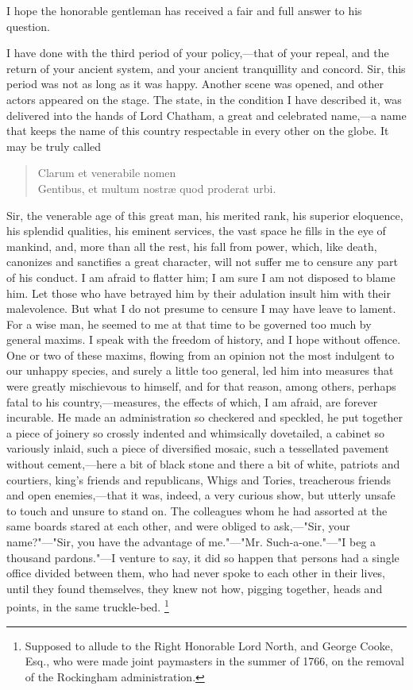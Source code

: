 I hope the honorable gentleman has received a fair and full answer to his question.

I have done with the third period of your policy,—that of your repeal, and the return of your ancient system, and your ancient tranquillity and concord. Sir, this period was not as long as it was happy. Another scene was opened, and other actors appeared on the stage. The state, in the condition I have described it, was delivered into the hands of Lord Chatham, a great and celebrated name,—a name that keeps the name of this country respectable in every other on the globe. It may be truly called

\begin{verse}
Clarum et venerabile nomen \\
Gentibus, et multum nostræ quod proderat urbi.
\end{verse}

Sir, the venerable age of this great man, his merited rank, his superior eloquence, his splendid qualities, his eminent services, the vast space he fills in the eye of mankind, and, more than all the rest, his fall from power, which, like death, canonizes and sanctifies a great character, will not suffer me to censure any part of his conduct. I am afraid to flatter him; I am sure I am not disposed to blame him. Let those who have betrayed him by their adulation insult him with their malevolence. But what I do not presume to censure I may have leave to lament. For a wise man, he seemed to me at that time to be governed too much by general maxims. I speak with the freedom of history, and I hope without offence. One or two of these maxims, flowing from an opinion not the most indulgent to our unhappy species, and surely a little too general, led him into measures that were greatly mischievous to himself, and for that reason, among others, perhaps fatal to his country,—measures, the effects of which, I am afraid, are forever incurable. He made an administration so checkered and speckled, he put together a piece of joinery so crossly indented and whimsically dovetailed, a cabinet so variously inlaid, such a piece of diversified mosaic, such a tessellated pavement without cement,—here a bit of black stone and there a bit of white, patriots and courtiers, king's friends and republicans, Whigs and Tories, treacherous friends and open enemies,—that it was, indeed, a very curious show, but utterly unsafe to touch and unsure to stand on. The colleagues whom he had assorted at the same boards stared at each other, and were obliged to ask,—"Sir, your name?"—"Sir, you have the advantage of me."—"Mr. Such-a-one."—"I beg a thousand pardons."—I venture to say, it did so happen that persons had a single office divided between them, who had never spoke to each other in their lives, until they found themselves, they knew not how, pigging together, heads and points, in the same truckle-bed.
\footnote{Supposed to allude to the Right Honorable Lord North, and George Cooke, Esq., who were made joint paymasters in the summer of 1766, on the removal of the Rockingham administration.}

